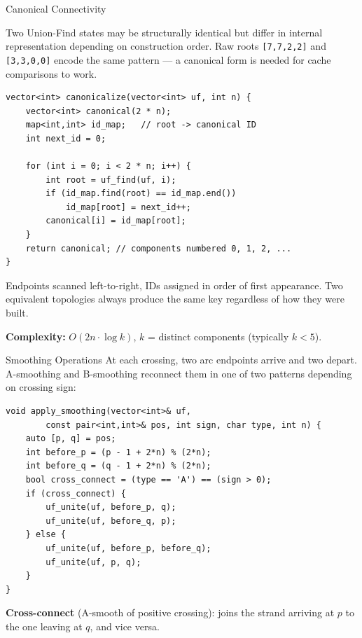 \documentclass[final]{beamer}
\newlength{\colwidth}
\begin{document}
\begin{frame}[t,fragile]
\begin{columns}[t]
\begin{column}{\colwidth}
  \begin{block}{Canonical Connectivity}

    Two Union-Find states may be structurally identical but differ in internal representation depending on construction order. Raw roots \texttt{[7,7,2,2]} and \texttt{[3,3,0,0]} encode the same pattern --- a canonical form is needed for cache comparisons to work.

    \vspace{0.1cm}

\begin{lstlisting}
vector<int> canonicalize(vector<int> uf, int n) {
    vector<int> canonical(2 * n);
    map<int,int> id_map;   // root -> canonical ID
    int next_id = 0;

    for (int i = 0; i < 2 * n; i++) {
        int root = uf_find(uf, i);
        if (id_map.find(root) == id_map.end())
            id_map[root] = next_id++;
        canonical[i] = id_map[root];
    }
    return canonical; // components numbered 0, 1, 2, ...
}
\end{lstlisting}

    \vspace{0.1cm}
    Endpoints scanned left-to-right, IDs assigned in order of first appearance. Two equivalent topologies always produce the same key regardless of how they were built.

    \textbf{Complexity:} $O(2n \cdot \log k)$, $k$ = distinct components (typically $k < 5$).
  \end{block}

  \begin{block}{Smoothing Operations}
    At each crossing, two arc endpoints arrive and two depart. A-smoothing and B-smoothing reconnect them in one of two patterns depending on crossing sign:

\begin{lstlisting}
void apply_smoothing(vector<int>& uf,
        const pair<int,int>& pos, int sign, char type, int n) {
    auto [p, q] = pos;
    int before_p = (p - 1 + 2*n) % (2*n);
    int before_q = (q - 1 + 2*n) % (2*n);
    bool cross_connect = (type == 'A') == (sign > 0);
    if (cross_connect) {
        uf_unite(uf, before_p, q);
        uf_unite(uf, before_q, p);
    } else {
        uf_unite(uf, before_p, before_q);
        uf_unite(uf, p, q);
    }
}
\end{lstlisting}

    \vspace{0.1cm}
    \textbf{Cross-connect} (A-smooth of positive crossing): joins the strand arriving at $p$ to the one leaving at $q$, and vice versa.
    

\end{block}
\end{column}
\end{columns}
\end{frame}
\end{document}
